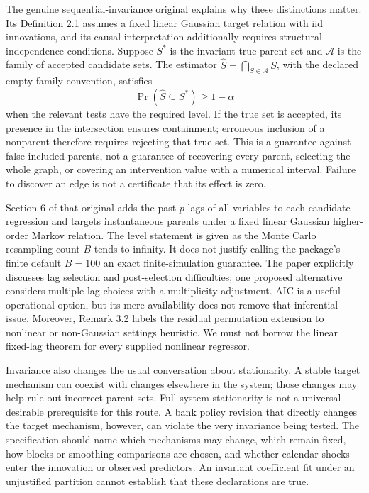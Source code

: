 The genuine sequential-invariance original explains why these distinctions
matter. Its Definition 2.1 assumes a fixed linear Gaussian target relation with
iid innovations, and its causal interpretation additionally requires structural
independence conditions. Suppose \(S^*\) is the invariant true parent set and
\(\mathcal A\) is the family of accepted candidate sets. The estimator
\(\widehat S=\bigcap_{S\in\mathcal A}S\), with the declared empty-family
convention, satisfies
\[
 \Pr(\widehat S\subseteq S^*)\geq 1-\alpha
\]
when the relevant tests have the required level. If the true set is accepted,
its presence in the intersection ensures containment; erroneous inclusion of a
nonparent therefore requires rejecting that true set. This is a guarantee against
false included parents, not a guarantee of recovering every parent, selecting the
whole graph, or covering an intervention value with a numerical interval.
Failure to discover an edge is not a certificate that its effect is zero.
\citep{exec14_rtime_pfister}

Section 6 of that original adds the past \(p\) lags of all variables to each
candidate regression and targets instantaneous parents under a fixed linear
Gaussian higher-order Markov relation. The level statement is given as the
Monte Carlo resampling count \(B\) tends to infinity. It does not justify calling
the package's finite default \(B=100\) an exact finite-simulation guarantee.
The paper explicitly discusses lag selection and post-selection difficulties;
one proposed alternative considers multiple lag choices with a multiplicity
adjustment. AIC is a useful operational option, but its mere availability does
not remove that inferential issue. Moreover, Remark 3.2 labels the residual
permutation extension to nonlinear or non-Gaussian settings heuristic. We must
not borrow the linear fixed-lag theorem for every supplied nonlinear regressor.
\citep{exec14_rtime_pfister,exec14_rtime_seqicp}

Invariance also changes the usual conversation about stationarity. A stable
target mechanism can coexist with changes elsewhere in the system; those changes
may help rule out incorrect parent sets. Full-system stationarity is not a
universal desirable prerequisite for this route. A bank policy revision that
directly changes the target mechanism, however, can violate the very invariance
being tested. The specification should name which mechanisms may change, which
remain fixed, how blocks or smoothing comparisons are chosen, and whether
calendar shocks enter the innovation or observed predictors. An invariant
coefficient fit under an unjustified partition cannot establish that these
declarations are true. \citep{exec14_rtime_pfister}

